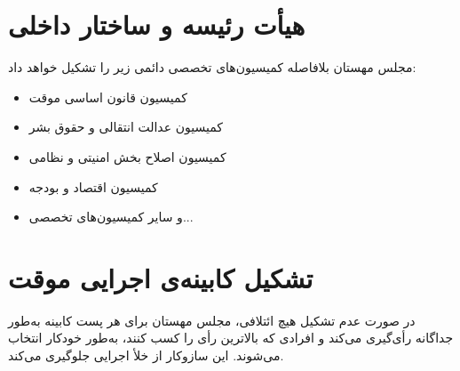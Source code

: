 \section{هیأت رئیسه و ساختار داخلی}
مجلس مهستان بلافاصله کمیسیون‌های تخصصی دائمی زیر را تشکیل خواهد داد:
\begin{itemize}
    \item کمیسیون قانون اساسی موقت
    \item کمیسیون عدالت انتقالی و حقوق بشر
    \item کمیسیون اصلاح بخش امنیتی و نظامی
    \item کمیسیون اقتصاد و بودجه
    \item و سایر کمیسیون‌های تخصصی...
\end{itemize}

\section{تشکیل کابینه‌ی اجرایی موقت}
در صورت عدم تشکیل هیچ ائتلافی، مجلس مهستان برای هر پست کابینه به‌طور جداگانه رأی‌گیری می‌کند و افرادی که بالاترین رأی را کسب کنند، به‌طور خودکار انتخاب می‌شوند. این سازوکار از خلأ اجرایی جلوگیری می‌کند.
